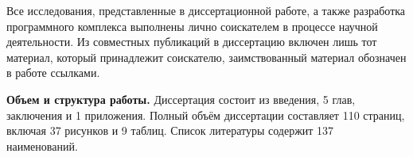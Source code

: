 {\contribution}
Все исследования, представленные в диссертационной работе, а также разработка программного комплекса выполнены лично соискателем в процессе научной деятельности. Из совместных публикаций в диссертацию включен лишь тот материал, который принадлежит соискателю, заимствованный материал обозначен в работе ссылками.

\ifsynopsis
\textbf{Объем и структура работы.} Диссертация состоит из введения, 5 глав, заключения и 1 приложения. Полный объём диссертации составляет 110 страниц, включая 37 рисунков и 9 таблиц. Список литературы содержит 137 наименований.
\fi


